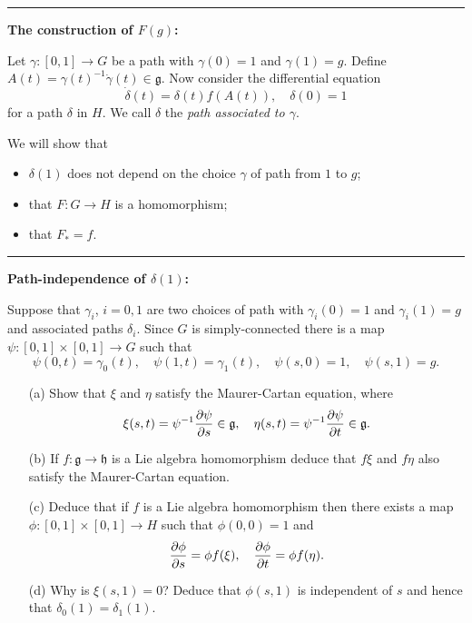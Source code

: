 \documentclass[12pt]{article}
\begin{document}
\bigskip
\hrule

{\bf The construction of $F(g)$:} 

Let $\gamma\colon[0,1]\to G$ be a path with $\gamma(0)=1$ and $\gamma(1)=g$. Define $A(t)=\gamma(t)^{-1}\dot{\gamma}(t)\in\mathfrak{g}$. Now consider the differential equation
\[\dot{\delta}(t)=\delta(t)f(A(t)),\quad\delta(0)=1\]
for a path $\delta$ in $H$. We call $\delta$ the {\em path associated to $\gamma$}.

\begin{center}\end{center}

We will show that
\begin{itemize}
\item $\delta(1)$ does not depend on the choice $\gamma$ of path from $1$ to $g$;
\item that $F\colon G\to H$ is a homomorphism;
\item that $F_*=f$.
\end{itemize}
\bigskip
\hrule
\bigskip

{\bf Path-independence of $\delta(1)$:}

Suppose that $\gamma_i$, $i=0,1$ are two choices of path with $\gamma_i(0)=1$ and $\gamma_i(1)=g$ and associated paths $\delta_i$. Since $G$ is simply-connected there is a map $\psi\colon[0,1]\times [0,1]\to G$ such that
\[\psi(0,t)=\gamma_0(t),\quad \psi(1,t)=\gamma_1(t),\quad\psi(s,0)=1,\quad\psi(s,1)=g.\]
\begin{question}
\begin{enumerate}
\item[(a)] Show that $\xi$ and $\eta$ satisfy the Maurer-Cartan equation, where
\[\xi(s,t)=\psi^{-1}\frac{\partial \psi}{\partial s}\in\mathfrak{g},\quad\eta(s,t)=\psi^{-1}\frac{\partial \psi}{\partial t}\in\mathfrak{g}.\]
\item[(b)] If $f\colon\mathfrak{g}\to\mathfrak{h}$ is a Lie algebra homomorphism deduce that $f\xi$ and $f\eta$ also satisfy the Maurer-Cartan equation.
\item[(c)] Deduce that if $f$ is a Lie algebra homomorphism then there exists a map $\phi\colon[0,1]\times[0,1]\to H$ such that $\phi(0,0)=1$ and
\[\frac{\partial \phi}{\partial s}=\phi f(\xi),\quad\frac{\partial \phi}{\partial t}=\phi f(\eta).\]
\item[(d)] Why is $\xi(s,1)=0$? Deduce that $\phi(s,1)$ is independent of $s$ and hence that $\delta_0(1)=\delta_1(1)$.
\end{enumerate}
\end{question}
\end{document}
